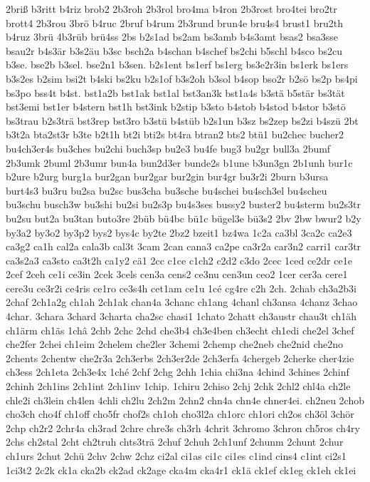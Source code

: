 {2briß
b3ritt
b4riz
brob2
2b3roh
2b3rol
bro4ma
b4ron
2b3rost
bro4tei
bro2tr
brott4
2b3rou
3brö
b4ruc
2bruf
b4rum
2b3rund
brun4e
bru4s4
brust1
bru2th
b4ruz
3brü
4b3rüb
brü4ss
2bs
b2s1ad
bs2am
bs3amb
b4s3amt
bsas2
bsa3sse
bsau2r
b4s3är
b3s2äu
b3sc
bsch2a
b4schan
b4schef
bs2chi
b5schl
b4sco
bs2cu
b3se.
bse2b
b3sel.
bse2n1
b3sen.
b2s1ent
bs1erf
bs1erg
bs3e2r3in
bs1erk
bs1ers
b3s2es
b2sim
bsi2t
b4ski
bs2ku
b2s1of
b3s2oh
b3sol
b4sop
bso2r
b2sö
bs2p
bs4pi
bs3po
bss4t
b4st.
bst1a2b
bst1ak
bst1al
bst3an3k
bst1a4s
b3stä
b5stär
bs3tät
bst3emi
bst1er
b4stern
bst1h
bst3ink
b2stip
b3sto
b4stob
b4stod
b4stor
b3stö
bs3trau
b2s3trä
bst3rep
bst3ro
b3stü
b4stüb
b2s1un
b3sz
bs2zep
bs2zi
b4szü
2bt
b3t2a
bta2st3r
b3te
b2t1h
bt2i
bti2s
bt4ra
btran2
bts2
btü1
bu2chec
bucher2
bu4ch3er4s
bu3ches
bu2chi
buch3sp
bu2e3
bu4fe
bug3
bu2gr
bull3a
2bumf
2b3umk
2buml
2b3umr
bun4a
bun2d3er
bunde2s
b1une
b3un3gn
2b1unh
bur1c
b2ure
b2urg
burg1a
bur2gan
bur2gar
bur2gin
bur4gr
bu3r2i
2burn
b3ursa
burt4s3
bu3ru
bu2sa
bu2sc
bus3cha
bu3sche
bu4schei
bu4sch3el
bu4scheu
bu3schu
busch3w
bu3shi
bu2si
bu2s3p
bu4s3ses
bussy2
buster2
bu4sterm
bu2s3tr
bu2su
but2a
bu3tan
buto3re
2büb
bü4bc
bü1c
bügel3e
bü3s2
2bv
2bw
bwur2
b2y
by3a2
by3o2
by3p2
bys2
bys4c
by2te
2bz2
bzeit1
bz4wa
1c2a
ca3bl
3ca2c
ca2e3
ca3g2
ca1h
cal2a
cala3b
cal3t
3cam
2can
cana3
ca2pe
ca3r2a
car3n2
carri1
car3tr
ca3s2a3
ca3sto
ca3t2h
ca1y2
cä1
2cc
c1ce
c1ch2
c2d2
c3do
2cec
1ced
ce2dr
ce1e
2cef
2ceh
ce1i
ce3in
2cek
3cels
cen3a
cens2
ce3nu
cen3un
ceo2
1cer
cer3a
cere1
cere3u
ce3r2i
ce4ris
ce1ro
ce3s4h
cet1am
ce1u
1cé
cg4re
c2h
2ch.
2chab
ch3a2b3i
2chaf
2ch1a2g
ch1ah
2ch1ak
chan4a
3chanc
ch1ang
4chanl
ch3ansa
4chanz
3chao
4char.
3chara
3chard
3charta
cha2sc
chasi1
1chato
2chatt
ch3austr
chau3t
ch1äh
ch1ärm
ch1äs
1châ
2chb
2chc
2chd
che3b4
ch3e4ben
ch3echt
ch1edi
che2el
3chef
che2fer
2chei
ch1eim
2chelem
che2ler
3chemi
2chemp
che2neb
che2nid
che2no
2chents
2chentw
che2r3a
2ch3erbs
2ch3er2de
2ch3erfa
4chergeb
2cherke
cher4zie
ch3ess
2ch1eta
2ch3e4x
1ché
2chf
2chg
2chh
1chia
chi3na
4chind
3chines
2chinf
2chinh
2ch1ins
2ch1int
2ch1inv
1chip.
1chiru
2chiso
2chj
2chk
2chl2
chl4a
ch2le
chle2i
ch3lein
ch4len
4chli
ch2lu
2ch2m
2chn2
chn4a
chn4e
chner4ei.
ch2neu
2chob
cho3ch
cho4f
ch1off
cho5fr
chof2s
ch1oh
cho3l2a
ch1orc
ch1ori
ch2os
ch3öl
3chör
2chp
ch2r2
2chr4a
ch3rad
2chre
chre3s
ch3rh
4chrit
3chromo
3chron
ch5ros
ch4ry
2chs
ch2stal
2cht
ch2truh
chts3trä
2chuf
2chuh
2ch1unf
2chunm
2chunt
2chur
ch1urs
2chut
2chü
2chv
2chw
2chz
ci2al
ci1as
ci1c
ci1es
c1ind
cins4
c1int
ci2s1
1ci3t2
2c2k
ck1a
cka2b
ck2ad
ck2age
cka4m
cka4r1
ck1ä
ck1ef
ck1eg
ck1eh
ck1ei
}
